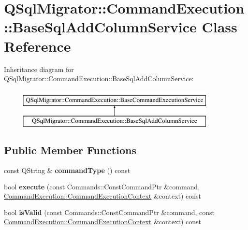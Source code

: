 \hypertarget{class_q_sql_migrator_1_1_command_execution_1_1_base_sql_add_column_service}{}\section{Q\+Sql\+Migrator\+:\+:Command\+Execution\+:\+:Base\+Sql\+Add\+Column\+Service Class Reference}
\label{class_q_sql_migrator_1_1_command_execution_1_1_base_sql_add_column_service}
Inheritance diagram for Q\+Sql\+Migrator\+:\+:Command\+Execution\+:\+:Base\+Sql\+Add\+Column\+Service\+:\begin{figure}[H]
\begin{center}
\leavevmode
\includegraphics[height=2.000000cm]{class_q_sql_migrator_1_1_command_execution_1_1_base_sql_add_column_service}
\end{center}
\end{figure}
\subsection*{Public Member Functions}
\begin{DoxyCompactItemize}
\item 
\mbox{\label{class_q_sql_migrator_1_1_command_execution_1_1_base_sql_add_column_service_ae60b5ac342c59c4f74f7743f9dfa1f57}} 
const Q\+String \& {\bfseries command\+Type} () const
\item 
\mbox{\label{class_q_sql_migrator_1_1_command_execution_1_1_base_sql_add_column_service_ab6c7105ff8e6e2e2c4b37ce6a021bd69}} 
bool {\bfseries execute} (const Commands\+::\+Const\+Command\+Ptr \&command, \hyperlink{class_q_sql_migrator_1_1_command_execution_1_1_command_execution_context}{Command\+Execution\+::\+Command\+Execution\+Context} \&context) const
\item 
\mbox{\label{class_q_sql_migrator_1_1_command_execution_1_1_base_sql_add_column_service_a78859e1028b58cf227edd0ad683237e4}} 
bool {\bfseries is\+Valid} (const Commands\+::\+Const\+Command\+Ptr \&command, const \hyperlink{class_q_sql_migrator_1_1_command_execution_1_1_command_execution_context}{Command\+Execution\+::\+Command\+Execution\+Context} \&context) const
\end{DoxyCompactItemize}
